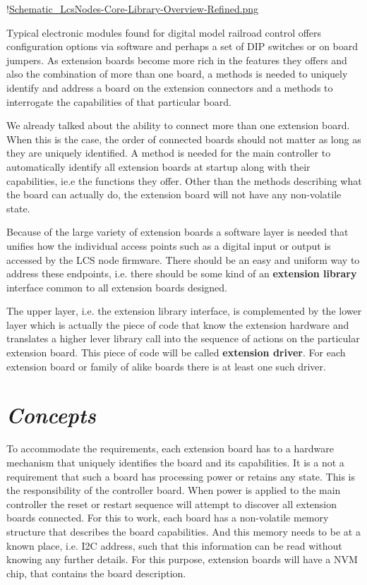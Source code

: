 !\href{./Figures/Schematic_LcsNodes-Core-Library-Overview-Refined.png }{Schematic_LcsNodes-Core-Library-Overview-Refined.png}

Typical electronic modules found for digital model railroad control offers configuration options via software and perhaps a set of DIP switches or on board jumpers. As extension boards become more rich in the features they offers and also the combination of more than one board, a methods is needed to uniquely identify and address a board on the extension connectors and a methods to interrogate the capabilities of that particular board.

We already talked about the ability to connect more than one extension board. When this is the case, the order of connected boards should not matter as long as they are uniquely identified. A method is needed for the main controller to automatically identify all extension boards at startup along with their capabilities, ie.e the functions they offer. Other than the methods describing what the board can actually do, the extension board will not have any non-volatile state.

Because of the large variety of extension boards a software layer is needed that unifies how the individual access points such as a digital input or output is accessed by the LCS node firmware. There should be an easy and uniform way to address these endpoints, i.e. there should be some kind of an \textbf{extension library} interface common to all extension boards designed.

The upper layer, i.e. the extension library interface, is complemented by the lower layer which is actually the piece of code that know the extension hardware and translates a higher lever library call into the sequence of actions on the particular extension board. This piece of code will be called \textbf{extension driver}. For each extension board or family of alike boards there is at least one such driver.

\section{\textit{Concepts}}

To accommodate the requirements, each extension board has to a hardware mechanism that uniquely identifies the board and its capabilities. It is a not a requirement that such a board has processing power or retains any state. This is the responsibility of the controller board. When power is applied to the main controller the reset or restart sequence will attempt to discover all extension boards connected. For this to work, each board has a non-volatile memory structure that describes the board capabilities. And this memory needs to be at a known place, i.e. I2C address, such that this information can be read without knowing any further details. For this purpose, extension boards will have a NVM chip, that contains the board description.


